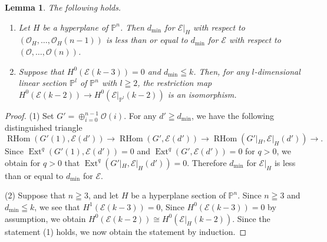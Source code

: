 \documentclass[a4paper,12pt]{amsart}
\newtheorem{lemma}[thm]{Lemma}%
\DeclareMathOperator{\Ext}{Ext}
\DeclareMathOperator{\RHom}{RHom}
\begin{document}
\begin{lemma}\label{hyperplaneIsom}
The following holds.
\begin{enumerate}
\item[(1)] Let $H$ be a hyperplane of $\mathbb{P}^n$. Then $d_{\min}$ for $\mathcal{E}|_H$ with respect to 
$(\mathcal{O}_H,\dots,\mathcal{O}_H(n-1))$ is less than or equal to $d_{\min}$ for $\mathcal{E}$ with respect to 
$(\mathcal{O},\dots,\mathcal{O}(n))$.
\item[(2)] Suppose that $H^0(\mathcal{E}(k-3))=0$ and $d_{\min}\leqq k$. Then,
for any $l$-dimensional linear section $\mathbb{P}^l$ of $\mathbb{P}^n$ with $l\geqq 2$,
the restriction map
$H^0(\mathcal{E}(k-2))\to H^0(\mathcal{E}|_{\mathbb{P}^l}(k-2))$
is an isomorphism.
\end{enumerate}
\end{lemma}
\begin{proof}
(1) Set $G'=\oplus_{i=0}^{n-1} \mathcal{O}(i)$.
For any $d'\geqq d_{\min}$, we have the following distinguished triangle
\[\RHom(G'(1),\mathcal{E}(d'))
\to
\RHom(G',\mathcal{E}(d'))
\to
\RHom(G'|_H,\mathcal{E}|_H(d'))
\to.
\]
Since $\Ext^q(G'(1),\mathcal{E}(d'))=0$
and $\Ext^q(G',\mathcal{E}(d'))=0$
for $q>0$,
we obtain for $q>0$ that $\Ext^q(G'|_H,\mathcal{E}|_H(d'))=0$.
Therefore $d_{\min}$ for $\mathcal{E}|_H$ is less than or equal to $d_{\min}$ for $\mathcal{E}$.

(2) Suppose that $n\geqq 3$, and let $H$ be a hyperplane section of $\mathbb{P}^n$.
Since $n\geqq 3$ and $d_{\min}\leqq k$, we see that $H^1(\mathcal{E}(k-3))=0$,
Since $H^0(\mathcal{E}(k-3))=0$ by assumption,
we obtain $H^0(\mathcal{E}(k-2))\cong H^0(\mathcal{E}|_{H}(k-2))$.
Since the statement (1) holds, we now obtain the statement by induction.
\end{proof}
\end{document}
